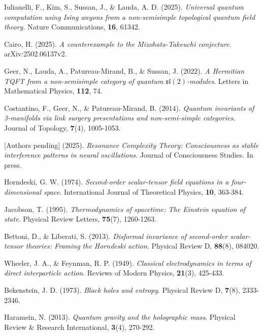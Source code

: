 \documentclass[openany]{memoir}
\theoremstyle{definition}
\theoremstyle{plain}
\theoremstyle{remark}
\begin{document}
\begin{thebibliography}{99}

Iulianelli, F., Kim, S., Sussan, J., \& Lauda, A. D. (2025). 
\textit{Universal quantum computation using Ising anyons from a non-semisimple topological quantum field theory}. 
Nature Communications, \textbf{16}, 61342.

Cairo, H. (2025). 
\textit{A counterexample to the Mizohata-Takeuchi conjecture}. 
arXiv:2502.06137v2.

Geer, N., Lauda, A., Patureau-Mirand, B., \& Sussan, J. (2022). 
\textit{A Hermitian TQFT from a non-semisimple category of quantum $\mathfrak{sl}(2)$-modules}. 
Letters in Mathematical Physics, \textbf{112}, 74.

Costantino, F., Geer, N., \& Patureau-Mirand, B. (2014). 
\textit{Quantum invariants of 3-manifolds via link surgery presentations and non-semi-simple categories}. 
Journal of Topology, \textbf{7}(4), 1005-1053.

[Authors pending] (2025). 
\textit{Resonance Complexity Theory: Consciousness as stable interference patterns in neural oscillations}. 
Journal of Consciousness Studies. In press.

Horndeski, G. W. (1974). 
\textit{Second-order scalar-tensor field equations in a four-dimensional space}. 
International Journal of Theoretical Physics, \textbf{10}, 363-384.

Jacobson, T. (1995). 
\textit{Thermodynamics of spacetime: The Einstein equation of state}. 
Physical Review Letters, \textbf{75}(7), 1260-1263.

Bettoni, D., \& Liberati, S. (2013). 
\textit{Disformal invariance of second-order scalar-tensor theories: Framing the Horndeski action}. 
Physical Review D, \textbf{88}(8), 084020.

Wheeler, J. A., \& Feynman, R. P. (1949). 
\textit{Classical electrodynamics in terms of direct interparticle action}. 
Reviews of Modern Physics, \textbf{21}(3), 425-433.

Bekenstein, J. D. (1973). 
\textit{Black holes and entropy}. 
Physical Review D, \textbf{7}(8), 2333-2346.

Haramein, N. (2013). 
\textit{Quantum gravity and the holographic mass}. 
Physical Review \& Research International, \textbf{3}(4), 270-292.


\end{thebibliography}
\end{document}
